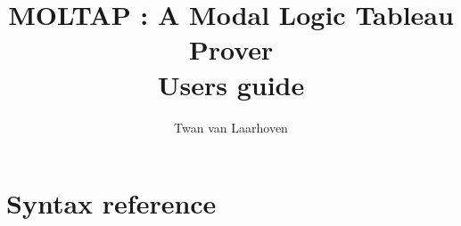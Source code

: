 \documentclass[a4paper]{article}
\title{MOLTAP : A Modal Logic Tableau Prover\\Users guide}
\author{Twan van Laarhoven}
\begin{document}
\maketitle

\newcommand{\heading}{\section}
\newcommand{\subheading}{\subsection}


\section{Syntax reference}
\renewcommand{\heading}{\subsection}

\end{document}
